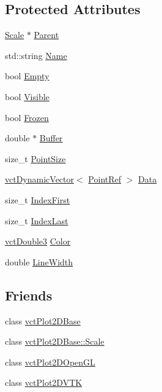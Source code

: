 \subsection*{Protected Attributes}
\begin{DoxyCompactItemize}
\item 
\hyperlink{classvct_plot2_d_base_1_1_scale}{Scale} $\ast$ \hyperlink{classvct_plot2_d_base_1_1_signal_ac96c27d6b67933a136845f700bc4e22c}{Parent}
\item 
std\-::string \hyperlink{classvct_plot2_d_base_1_1_signal_afbc80a39a5230239d4b8d55ea36586ea}{Name}
\item 
bool \hyperlink{classvct_plot2_d_base_1_1_signal_a6cb2569f99ffcc9a3cf4c4be60c94810}{Empty}
\item 
bool \hyperlink{classvct_plot2_d_base_1_1_signal_a7b4f18f8aef3c6353c64d86274c397bd}{Visible}
\item 
bool \hyperlink{classvct_plot2_d_base_1_1_signal_a3290add28cf7247ab5ca703b8b4ba9e7}{Frozen}
\item 
double $\ast$ \hyperlink{classvct_plot2_d_base_1_1_signal_a7b068b5ebd95f73ccafa04c5f7e10b28}{Buffer}
\item 
size\-\_\-t \hyperlink{classvct_plot2_d_base_1_1_signal_a3c18f2c69447f7e310510f9749f9000f}{Point\-Size}
\item 
\hyperlink{classvct_dynamic_vector}{vct\-Dynamic\-Vector}$<$ \hyperlink{classvct_plot2_d_base_1_1_signal_a81b636c91281333319b7f806b8432b92}{Point\-Ref} $>$ \hyperlink{classvct_plot2_d_base_1_1_signal_a67281dea46193aed681097745bb88c81}{Data}
\item 
size\-\_\-t \hyperlink{classvct_plot2_d_base_1_1_signal_ada6747545b67992a43f9b7670ec3be78}{Index\-First}
\item 
size\-\_\-t \hyperlink{classvct_plot2_d_base_1_1_signal_aa1abcd7a414b288732279f5e2868abcd}{Index\-Last}
\item 
\hyperlink{vct_fixed_size_vector_types_8h_a4a89122c9d7f72c3f31fe8126e17c3af}{vct\-Double3} \hyperlink{classvct_plot2_d_base_1_1_signal_a8c99562aebf260551eaf9444b25d7cc9}{Color}
\item 
double \hyperlink{classvct_plot2_d_base_1_1_signal_a9f7fa630a56b5168d0150c2079a40048}{Line\-Width}
\end{DoxyCompactItemize}
\subsection*{Friends}
\begin{DoxyCompactItemize}
\item 
class \hyperlink{classvct_plot2_d_base_1_1_signal_ab1e5a371f284a693f5624104a92ac684}{vct\-Plot2\-D\-Base}
\item 
class \hyperlink{classvct_plot2_d_base_1_1_signal_a2608173200dac970514b9c1d56379e99}{vct\-Plot2\-D\-Base\-::\-Scale}
\item 
class \hyperlink{classvct_plot2_d_base_1_1_signal_a2a04e9e21d2a68342a48b433ff25b7f7}{vct\-Plot2\-D\-Open\-G\-L}
\item 
class \hyperlink{classvct_plot2_d_base_1_1_signal_a61e8f9a436596e1195d2b34b7b5c6f2e}{vct\-Plot2\-D\-V\-T\-K}
\end{DoxyCompactItemize}


